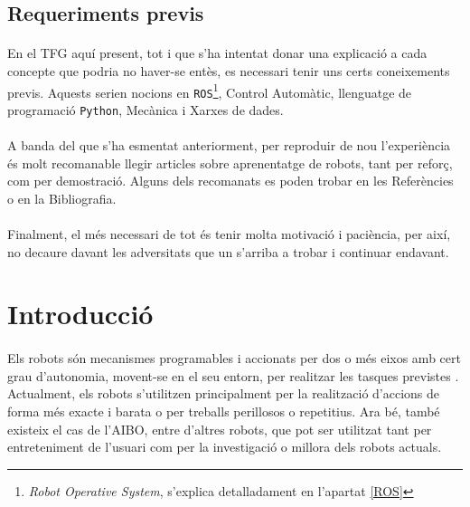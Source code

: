 \documentclass[12pt,a4paper,final,twoside]{article}
\begin{document}
\subsection*{Requeriments previs}

\paragraph{}En el TFG aquí present, tot i que s'ha intentat donar una explicació a cada concepte que podria no haver-se entès, es necessari tenir uns certs coneixements previs. Aquests serien nocions en \texttt{ROS}\footnote{\textit{Robot Operative System}, s'explica detalladament en l'apartat \ref{ROS}}, Control Automàtic, llenguatge de programació \texttt{Python}, Mecànica i Xarxes de dades.

\paragraph{}A banda del que s'ha esmentat anteriorment, per reproduir de nou l'experiència és molt recomanable llegir articles sobre aprenentatge de robots, tant per reforç, com per demostració. Alguns dels recomanats es poden trobar en les Referències o en la Bibliografia.

\paragraph{}Finalment, el més necessari de tot és tenir molta motivació i paciència, per així, no decaure davant les adversitats que un s'arriba a trobar i continuar endavant.

\newpage
\section*{Introducció}

\paragraph{}Els robots són mecanismes programables i accionats per dos o més eixos amb cert grau d'autonomia, movent-se en el seu entorn, per realitzar les tasques previstes \cite{ISO_Robot}. Actualment, els robots s'utilitzen principalment per la realització d'accions de forma més exacte i barata o per treballs perillosos o repetitius. Ara bé, també existeix el cas de l'AIBO, entre d'altres robots, que pot ser utilitzat tant per entreteniment de l'usuari com per la investigació o millora dels robots actuals.
\end{document}
